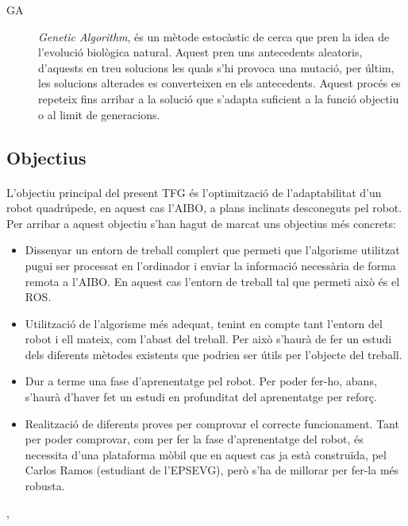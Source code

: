 \documentclass[12pt,a4paper,final,twoside]{article}
\begin{document}
\begin{description}
\item[GA] \textit{Genetic Algorithm}, és un mètode estocàstic de cerca que pren la idea de l'evolució biològica natural. Aquest pren uns antecedents aleatoris, d'aquests en treu solucions les quals s'hi provoca una mutació, per últim, les solucions alterades es converteixen en els antecedents. Aquest procés es repeteix fins arribar a la solució que s'adapta suficient a la funció objectiu o al limit de generacions.

\end{description}


\label{Objectius}
\subsection*{Objectius}

\paragraph{}L'objectiu principal del present TFG és l'optimització de l'adaptabilitat d'un robot quadrúpede, en aquest cas l'AIBO, a plans inclinats desconeguts pel robot. Per arribar a aquest objectiu s'han hagut de marcat uns objectius més concrets:
\begin{itemize}
\item Dissenyar un entorn de treball complert que permeti que l'algorisme utilitzat pugui ser processat en l'ordinador i enviar la informació necessària de forma remota a l'AIBO. En aquest cas l'entorn de treball tal que permeti això és el ROS.
\item Utilització de l'algorisme més adequat, tenint en compte tant l'entorn del robot i ell mateix, com l'abast del treball. Per això s'haurà de fer un estudi dels diferents mètodes existents que podrien ser útils per l'objecte del treball.
\item Dur a terme una fase d'aprenentatge pel robot. Per poder fer-ho, abans, s'haurà d'haver fet un estudi en profunditat del aprenentatge per reforç.
\item Realització de diferents proves per comprovar el correcte funcionament. Tant per poder comprovar, com per fer la fase d'aprenentatge del robot, és necessita d'una plataforma mòbil que en aquest cas ja està construïda, pel Carlos Ramos (estudiant de l'EPSEVG)\cite{TFG_Carlos_Ramos}, però s'ha de millorar per fer-la més robusta.
\end{itemize},


\label{Abast}
\end{document}

